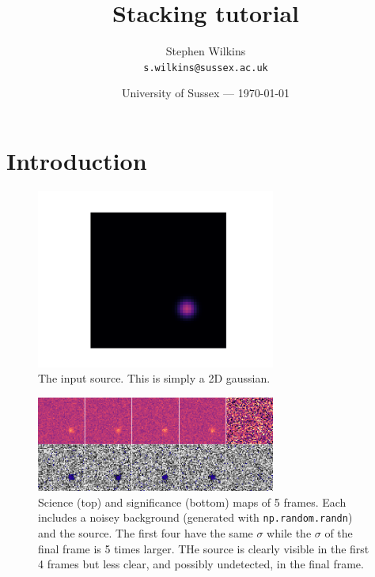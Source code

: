 \documentclass{article}
\title{Stacking tutorial} %
\author{Stephen Wilkins\\ \texttt{s.wilkins@sussex.ac.uk}} %
\date{University of Sussex --- \today} %
\begin{document}
\maketitle %


\section*{Introduction} %





\begin{figure}\label{fig:source}
	\centering
	\includegraphics[width=0.7\textwidth]{../code/figs/source.pdf}
	\caption{The input source. This is simply a 2D gaussian.}
\end{figure}

\begin{figure}\label{fig:frames}
	\centering
	\includegraphics[width=0.7\textwidth]{../code/figs/frames.pdf}
	\caption{Science (top) and significance (bottom) maps of 5 frames. Each includes a noisey background (generated with \texttt{np.random.randn}) and the source. The first four have the same $\sigma$ while the $\sigma$ of the final frame is 5 times larger. THe source is clearly visible in the first 4 frames but less clear, and possibly undetected, in the final frame. }
\end{figure}
\end{document}
